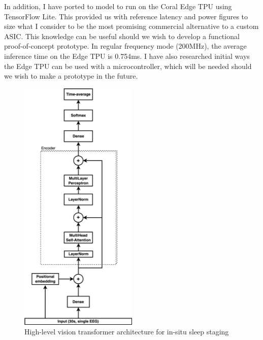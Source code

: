 \documentclass[12pt]{article}
\begin{document}
    In addition, I have ported to model to run on the Coral Edge TPU using TensorFlow Lite. This provided us with reference latency and power figures to size what I consider to be the most promising
    commercial alternative to a custom ASIC. This knowledge can be useful should we wish to develop a functional proof-of-concept prototype. In regular frequency mode (200MHz), the average inference time on the Edge TPU is 0.754ms. I have also researched initial ways the Edge TPU can be used with a 
    microcontroller, which will be needed should we wish to make a prototype in the future.

    \begin{figure}
        \centering
        \includegraphics[width=0.5\textwidth]{assets/vit.jpg}
        \caption{High-level vision transformer architecture for in-situ sleep staging}
        \label{fig:vit}
    \end{figure}
\end{document}
